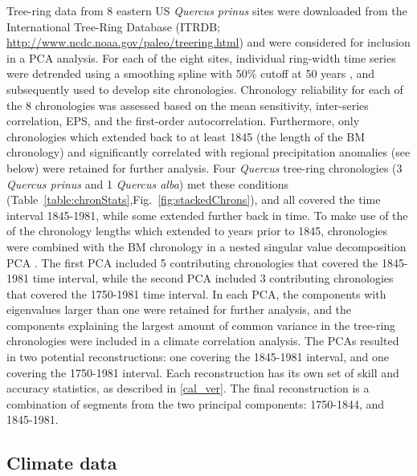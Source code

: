 
Tree-ring data from 8 eastern US \textit{Quercus prinus} sites
were downloaded from the International Tree-Ring Database (ITRDB;
\url{http://www.ncdc.noaa.gov/paleo/treering.html}) and were
considered for inclusion in a PCA analysis. For each of the eight
sites, individual ring-width time series were detrended using a
smoothing spline with 50\% cutoff at 50 years  \cite{cook1981smoothing}, and subsequently used
to develop site chronologies. Chronology reliability for each of the 8
chronologies was assessed based on the mean sensitivity, inter-series
correlation, EPS, and the first-order autocorrelation. Furthermore,
only chronologies which extended back to at least 1845 (the
length of the BM chronology) and significantly correlated with
regional precipitation anomalies (see below) were retained for
further analysis. Four \textit{Quercus} tree-ring chronologies (3
\textit{Quercus prinus} and 1 \textit{Quercus alba}) met these conditions
(Table~\ref{table:chronStats},Fig.~\ref{fig:stackedChrons}), and all
covered the time interval 1845-1981, while some extended further back
in time. To make use of the of the chronology lengths which extended to
years prior to 1845, chronologies were combined with the BM chronology
in a nested singular value decomposition PCA \cite{wold1987principal,
cook2007north}. The first PCA included 5 contributing chronologies that
covered the 1845-1981 time interval, while the second PCA included 3
contributing chronologies that covered the 1750-1981 time interval. In
each PCA, the components with eigenvalues larger than one were retained
for further analysis, and the components explaining the largest amount of
common variance in the tree-ring chronologies were included in a climate
correlation analysis. The PCAs resulted in two potential reconstructions:
one covering the 1845-1981 interval, and one covering the 1750-1981
interval. Each reconstruction has its own set of skill and accuracy
statistics, as described in \ref{cal_ver}. The final reconstruction is
a combination of segments from the two principal components: 1750-1844,
and 1845-1981.

\subsection{Climate data}

